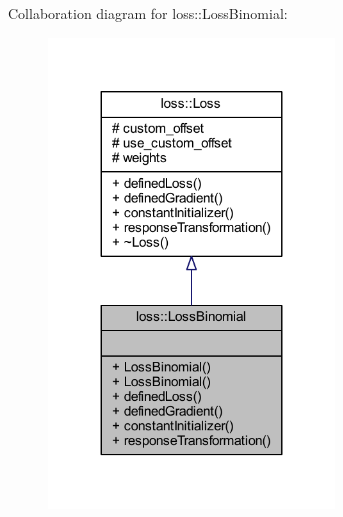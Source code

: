 Collaboration diagram for loss\+:\+:Loss\+Binomial\+:\nopagebreak
\begin{figure}[H]
\begin{center}
\leavevmode
\includegraphics[width=215pt]{classloss_1_1_loss_binomial__coll__graph}
\end{center}
\end{figure}
